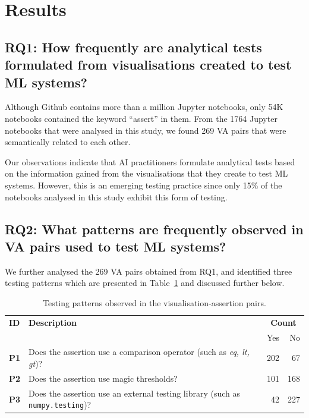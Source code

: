 \documentclass[conference]{IEEEtran}
\begin{document}
\section{Results}\label{sec:result}
\subsection{RQ1: How frequently are analytical tests formulated from visualisations created to test ML systems?}\label{sec:result-rq1}

Although Github contains more than a million Jupyter notebooks, only 54K notebooks contained the keyword ``assert'' in them. From the 1764 Jupyter notebooks that were analysed in this study, we found 269 VA pairs that were semantically related to each other.

Our observations indicate that AI practitioners formulate analytical tests based on the information gained from the visualisations that they create to test ML systems. However, this is an emerging testing practice since only 15\% of the notebooks analysed in this study exhibit this form of testing.

\subsection{RQ2: What patterns are frequently observed in VA pairs used to test ML systems?}\label{sec:result-rq2}

We further analysed the 269 VA pairs obtained from RQ1, and identified three testing patterns which are presented in Table~\ref{tab:testing-patterns} and discussed further below.

\begin{table}
  \centering
  \caption{Testing patterns observed in the visualisation-assertion pairs.}
  \begin{tabularx}{0.45\textwidth}{@{}l X r r@{}}
    \toprule
    \textbf{ID} &
    \textbf{Description} &
    \multicolumn{2}{c}{\textbf{Count}}\\
    & & Yes & No\\
    \midrule
    \textbf{P1} &
    Does the assertion use a comparison operator (such as \emph{eq, lt, gt})? &
    202 & 67\\
    \textbf{P2} &
    Does the assertion use magic thresholds? &
    101 & 168\\
    \textbf{P3} &
    Does the assertion use an external testing library (such as \texttt{numpy.testing})? &
    42 & 227\\
    \bottomrule
  \end{tabularx}
  \label{tab:testing-patterns}
\end{table}
\end{document}
